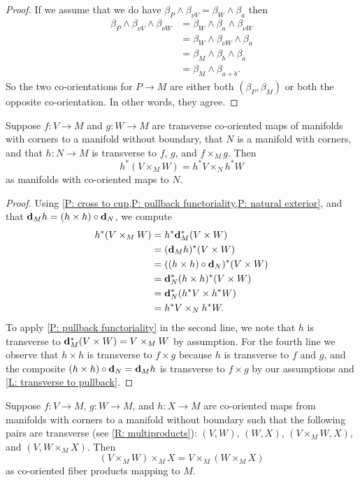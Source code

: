 \begin{proof}
	If we assume that we do have $\beta_P \wedge \beta_{\nu V} = \beta_W \wedge \beta_a$ then
	\begin{align*}
		\beta_P \wedge \beta_{\nu V} \wedge \beta_{\nu W}& = \beta_W \wedge \beta_a \wedge \beta_{\nu W}\\
		& = \beta_W \wedge \beta_{\nu W} \wedge \beta_a\\
		& = \beta_M \wedge \beta_b \wedge \beta_a\\
		& = \beta_M \wedge \beta_{a+b}.
	\end{align*}
	So the two co-orientations for $P \to M$ are either both $(\beta_P,\beta_M)$ or both the opposite co-orientation.
	In other words, they agree.
\end{proof}

\begin{corollary}\label{C: fiber natural pullback}
	Suppose $f \colon V \to M$ and $g \colon W \to M$ are transverse co-oriented maps of manifolds with corners to a manifold without boundary, that $N$ is a manifold with corners, and that $h \colon N \to M$ is transverse to $f$, $g$, and $f \times_M g$.
	Then
	$$h^*(V \times_M W) = h^*V \times_N h^*W$$
	as manifolds with co-oriented maps to $N$.
\end{corollary}

\begin{proof}
	Using \cref{P: cross to cup,P: pullback functoriality,P: natural exterior}, and that $\mathbf{d}_M h = (h \times h) \circ \mathbf{d}_N$,
	we compute
	\begin{align*}
		h^*(V \times_M W)& = h^*\mathbf{d}_M^*(V \times W)\\
		& = (\mathbf{d}_M h)^*(V \times W)\\
		& = ((h \times h) \circ \mathbf{d}_N)^*(V \times W)\\
		& = \mathbf{d}_N^*(h \times h)^*(V \times W)\\
		& = \mathbf{d}_N^*(h^*V \times h^*W)\\
		& = h^*V \times_N h^*W.
	\end{align*}
	To apply \cref{P: pullback functoriality} in the second line, we note that $h$ is transverse to $\mathbf{d}_M^*(V \times W) = V \times_M W$ by assumption.
	For the fourth line we observe that $h \times h$ is transverse to $f \times g$ because $h$ is transverse to $f$ and $g$, and the composite $(h \times h) \circ \mathbf{d}_N = \mathbf{d}_M h$ is transverse to $f \times g$ by our assumptions and \cref{L: transverse to pullback}.
\end{proof}

\begin{corollary}\label{C: fiber assoc}
	Suppose $f \colon V \to M$, $g \colon W \to M$, and $h \colon X \to M$ are co-oriented maps from manifolds with corners to a manifold without boundary such that the following pairs are transverse (see \cref{R: multiproducts}): $(V,W)$, $(W,X)$, $(V \times_M W,X)$, and $(V,W \times_M X)$.
	Then $$(V \times_M W) \times_M X = V \times_M (W \times_M X)$$ as co-oriented fiber products mapping to $M$.
\end{corollary}

